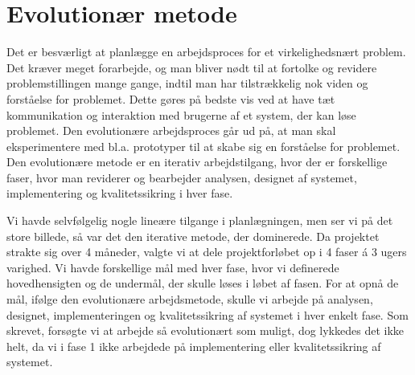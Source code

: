 \section{Evolutionær metode}
\label{sec:evolution}

Det er besværligt at planlægge en arbejdsproces for et virkelighedsnært problem. Det kræver meget forarbejde, og man bliver nødt til at fortolke og revidere problemstillingen mange gange, indtil man har tilstrækkelig nok viden og forståelse for problemet. Dette gøres på bedste vis ved at have tæt kommunikation og interaktion med brugerne af et system, der kan løse problemet. Den evolutionære arbejdsproces går ud på, at man skal eksperimentere med bl.a. prototyper til at skabe sig en forståelse for problemet. \cite{cic} Den evolutionære metode er en iterativ arbejdstilgang, hvor der er forskellige faser, hvor man reviderer og bearbejder analysen, designet af systemet, implementering og kvalitetssikring i hver fase.

Vi havde selvfølgelig nogle lineære tilgange i planlægningen, men ser vi på det store billede, så var det den iterative metode, der dominerede. Da projektet strakte sig over 4 måneder, valgte vi at dele projektforløbet op i 4 faser á 3 ugers varighed. Vi havde forskellige mål med hver fase, hvor vi definerede hovedhensigten og de undermål, der skulle løses i løbet af fasen. For at opnå de mål, ifølge den evolutionære arbejdsmetode, skulle vi arbejde på analysen, designet, implementeringen og kvalitetssikring af systemet i hver enkelt fase. Som skrevet, forsøgte vi at arbejde så evolutionært som muligt, dog lykkedes det ikke helt, da vi \fx i fase 1 ikke arbejdede på implementering eller kvalitetssikring af systemet.



